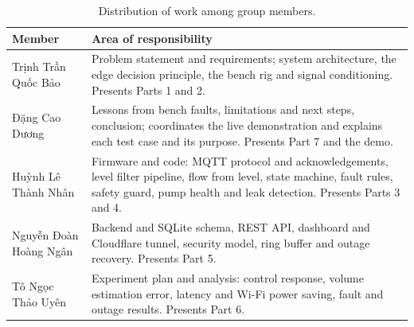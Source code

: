 \begin{table}[H]
\caption{Distribution of work among group members.}
\label{tab:phancong}
\centering
\renewcommand{\arraystretch}{1.15}
\begin{tabular}{|p{4.6cm}|p{8.4cm}|}
\hline
\textbf{Member} & \textbf{Area of responsibility} \\
\hline
\raggedright Trịnh Trần Quốc Bảo\newline 24119016 & Problem statement and requirements; system architecture, the edge decision principle, the bench rig and signal conditioning. Presents Parts 1 and 2. \\
\hline
\raggedright Đặng Cao Dương\newline 24119024 & Lessons from bench faults, limitations and next steps, conclusion; coordinates the live demonstration and explains each test case and its purpose. Presents Part 7 and the demo. \\
\hline
\raggedright Huỳnh Lê Thành Nhân\newline 24119068 & Firmware and code: MQTT protocol and acknowledgements, level filter pipeline, flow from level, state machine, fault rules, safety guard, pump health and leak detection. Presents Parts 3 and 4. \\
\hline
\raggedright Nguyễn Đoàn Hoàng Ngân\newline 24119064 & Backend and SQLite schema, REST API, dashboard and Cloudflare tunnel, security model, ring buffer and outage recovery. Presents Part 5. \\
\hline
\raggedright Tô Ngọc Thảo Uyên\newline 24119098 & Experiment plan and analysis: control response, volume estimation error, latency and Wi-Fi power saving, fault and outage results. Presents Part 6. \\
\hline
\end{tabular}
\end{table}
